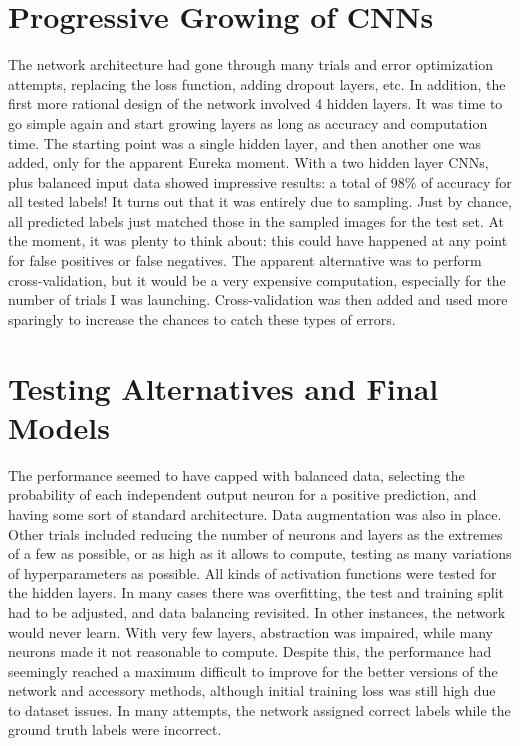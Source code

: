 \documentclass{article}
\begin{document}
\section{Progressive Growing of CNNs}
The network architecture had gone through many trials and error optimization attempts, replacing the loss function, adding dropout layers, etc.
In addition, the first more rational design of the network involved 4 hidden layers.
It was time to go simple again and start growing layers as long as accuracy and computation time.
The starting point was a single hidden layer, and then another one was added, only for the apparent Eureka moment.
With a two hidden layer CNNs, plus balanced input data showed impressive results: a total of 98\% of accuracy for all tested labels!
It turns out that it was entirely due to sampling.
Just by chance, all predicted labels just matched those in the sampled images for the test set.
At the moment, it was plenty to think about: this could have happened at any point for false positives or false negatives.
The apparent alternative was to perform cross-validation, but it would be a very expensive computation, especially for the number of trials I was launching.
Cross-validation was then added and used more sparingly to increase the chances to catch these types of errors.


\section{Testing Alternatives and Final Models}
The performance seemed to have capped with balanced data, selecting the probability of each independent output neuron for a positive prediction, and having some sort of standard architecture.
Data augmentation was also in place.
Other trials included reducing the number of neurons and layers as the extremes of a few as possible, or as high as it allows to compute, testing as many variations of hyperparameters as possible.
All kinds of activation functions were tested for the hidden layers.
In many cases there was overfitting, the test and training split had to be adjusted, and data balancing revisited.
In other instances, the network would never learn.
With very few layers, abstraction was impaired, while many neurons made it not reasonable to compute.
Despite this, the performance had seemingly reached a maximum difficult to improve for the better versions of the network and accessory methods, although initial training loss was still high due to dataset issues.
In many attempts, the network assigned correct labels while the ground truth labels were incorrect.
\end{document}
